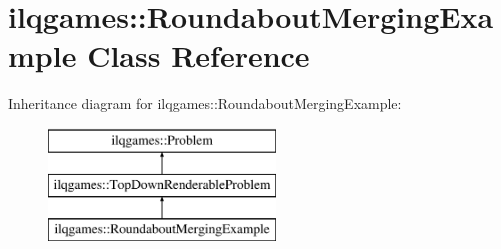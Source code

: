\hypertarget{classilqgames_1_1_roundabout_merging_example}{}\section{ilqgames\+:\+:Roundabout\+Merging\+Example Class Reference}
\label{classilqgames_1_1_roundabout_merging_example}
Inheritance diagram for ilqgames\+:\+:Roundabout\+Merging\+Example\+:\begin{figure}[H]
\begin{center}
\leavevmode
\includegraphics[height=3.000000cm]{classilqgames_1_1_roundabout_merging_example}
\end{center}
\end{figure}
